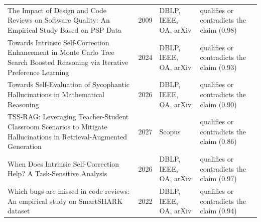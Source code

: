 \begin{longtable}{@{}%
  >{\raggedright\arraybackslash}p{}c%
  >{\raggedright\arraybackslash}p{}%
  >{\raggedright\arraybackslash}p{}@{}}
The Impact of Design and Code Reviews on Software Quality: An Empirical Study Based on PSP Data & 2009 & DBLP, IEEE, OA, arXiv & qualifies or contradicts the claim (0.98) \\
Towards Intrinsic Self-Correction Enhancement in Monte Carlo Tree Search Boosted Reasoning via Iterative Preference Learning & 2024 & DBLP, IEEE, OA, arXiv & qualifies or contradicts the claim (0.93) \\
Towards Self-Evaluation of Sycophantic Hallucinations in Mathematical Reasoning & 2026 & DBLP, IEEE, OA, arXiv & qualifies or contradicts the claim (0.90) \\
TSS-RAG: Leveraging Teacher-Student Classroom Scenarios to Mitigate Hallucinations in Retrieval-Augmented Generation & 2027 & Scopus & qualifies or contradicts the claim (0.86) \\
When Does Intrinsic Self-Correction Help? A Task-Sensitive Analysis & 2026 & DBLP, IEEE, OA, arXiv & qualifies or contradicts the claim (0.97) \\
Which bugs are missed in code reviews: An empirical study on SmartSHARK dataset & 2022 & DBLP, IEEE, OA, arXiv & qualifies or contradicts the claim (0.94) \\
\end{longtable}
\endgroup
